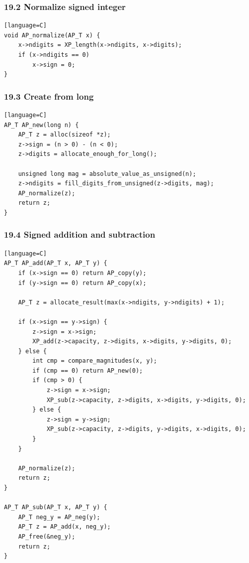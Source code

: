 \documentclass[11pt]{article}
\begin{document}
\subsubsection{19.2 Normalize signed integer}\label{normalize-signed-integer}

\begin{verbatim}[language=C]
void AP_normalize(AP_T x) {
    x->ndigits = XP_length(x->ndigits, x->digits);
    if (x->ndigits == 0)
        x->sign = 0;
}
\end{verbatim}

\subsubsection{19.3 Create from long}\label{create-from-long}

\begin{verbatim}[language=C]
AP_T AP_new(long n) {
    AP_T z = alloc(sizeof *z);
    z->sign = (n > 0) - (n < 0);
    z->digits = allocate_enough_for_long();

    unsigned long mag = absolute_value_as_unsigned(n);
    z->ndigits = fill_digits_from_unsigned(z->digits, mag);
    AP_normalize(z);
    return z;
}
\end{verbatim}

\subsubsection{19.4 Signed addition and subtraction}\label{signed-addition-and-subtraction}

\begin{verbatim}[language=C]
AP_T AP_add(AP_T x, AP_T y) {
    if (x->sign == 0) return AP_copy(y);
    if (y->sign == 0) return AP_copy(x);

    AP_T z = allocate_result(max(x->ndigits, y->ndigits) + 1);

    if (x->sign == y->sign) {
        z->sign = x->sign;
        XP_add(z->capacity, z->digits, x->digits, y->digits, 0);
    } else {
        int cmp = compare_magnitudes(x, y);
        if (cmp == 0) return AP_new(0);
        if (cmp > 0) {
            z->sign = x->sign;
            XP_sub(z->capacity, z->digits, x->digits, y->digits, 0);
        } else {
            z->sign = y->sign;
            XP_sub(z->capacity, z->digits, y->digits, x->digits, 0);
        }
    }

    AP_normalize(z);
    return z;
}

AP_T AP_sub(AP_T x, AP_T y) {
    AP_T neg_y = AP_neg(y);
    AP_T z = AP_add(x, neg_y);
    AP_free(&neg_y);
    return z;
}
\end{verbatim}
\end{document}
